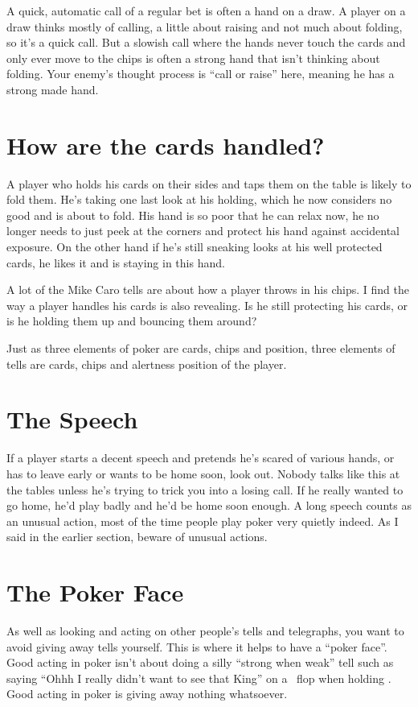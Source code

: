 A quick, automatic call of a regular bet is often a hand on a
draw. A player on a draw thinks mostly of calling, a little about raising
and not much about folding, so it's a quick call. But a slowish call
where the hands never touch the cards and only ever move to the chips
is often a strong hand that isn't thinking about folding. Your enemy's
thought process is ``call or raise'' here, meaning he has a strong
made hand.

\section{How are the cards handled?}

A player who holds his cards on their sides and taps them on
the table is likely to fold them. He's taking one last look
at his holding, which he now considers no good and is about
to fold. His hand is so poor that he can relax now, he no longer
needs to just peek at the corners and protect his hand against
accidental exposure. On the other hand if he's still sneaking looks at
his well protected cards, he likes it and is staying in this hand.

A lot of the Mike Caro tells are about how a player
throws in his chips. I find the way a player
handles his cards is also revealing. Is he still protecting
his cards, or is he holding them up and bouncing them around?

Just as three elements of poker are cards, chips and position,
three elements of tells are cards, chips and alertness position
of the player.

\section{The Speech}

If a player starts a decent speech and pretends he's scared of various
hands, or has to leave early or wants to be home soon, look out.
Nobody talks like this at the tables unless he's trying to trick
you into a losing call. If he really wanted to go home, he'd play
badly and he'd be home soon enough. A long speech counts as an unusual
action, most of the time people play poker very quietly indeed. As I
said in the earlier section, beware of unusual actions.

\section{The Poker Face}

As well as looking and acting on other people's tells and telegraphs,
you want to avoid giving away tells yourself. This is where it helps
to have a ``poker face''. Good acting in poker isn't about doing
a silly ``strong when weak'' tell such as saying ``Ohhh I really
didn't want to see that King'' on a \Kh\Qd\eigc\ flop when holding \Ks\Kc.
Good acting in poker is giving away nothing whatsoever.

